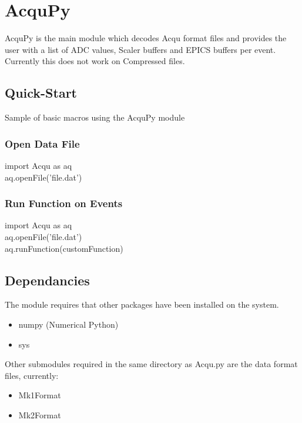 \section{AcquPy}
AcquPy is the main module which decodes Acqu format files and provides the user with a list of ADC values, Scaler buffers and EPICS buffers per event. Currently this does not work on Compressed files.

\subsection{Quick-Start}
Sample of basic macros using the AcquPy module
\subsubsection{Open Data File}
import Acqu as aq\\
aq.openFile('file.dat')\\
\subsubsection{Run Function on Events}
import Acqu as aq\\
aq.openFile('file.dat')\\
aq.runFunction(customFunction)\\

\subsection{Dependancies}
The module requires that other packages have been installed on the system.

\begin{itemize}
\item numpy (Numerical Python)
\item sys
\end{itemize}

Other submodules required in the same directory as Acqu.py are the data format files, currently:
\begin{itemize}
\item Mk1Format
\item Mk2Format  
\end{itemize}

